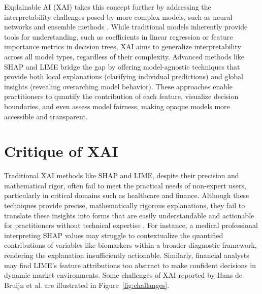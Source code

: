 \documentclass[times, twoside, watermark]{zHenriquesLab-StyleBioRxiv}
\begin{document}
Explainable AI (XAI) takes this concept further by addressing the interpretability challenges posed by more complex models, such as neural networks and ensemble methods \cite{typeexplain}. While traditional models inherently provide tools for understanding, such as coefficients in linear regression or feature importance metrics in decision trees, XAI aims to generalize interpretability across all model types, regardless of their complexity. Advanced methods like SHAP \cite{lundberg2017unified} and LIME \cite{ribeiro2016should} bridge the gap by offering model-agnostic techniques that provide both local explanations (clarifying individual predictions) and global insights (revealing overarching model behavior). These approaches enable practitioners to quantify the contribution of each feature, visualize decision boundaries, and even assess model fairness, making opaque models more accessible and transparent.




\section*{Critique of XAI}
Traditional XAI methods like SHAP and LIME, despite their precision and mathematical rigor, often fail to meet the practical needs of non-expert users, particularly in critical domains such as healthcare and finance. Although these techniques provide precise, mathematically rigorous explanations, they fail to translate these insights into forms that are easily understandable and actionable for practitioners without technical expertise \cite{vernaza2023contextualising}. For instance, a medical professional interpreting SHAP values may struggle to contextualize the quantified contributions of variables like biomarkers within a broader diagnostic framework, rendering the explanation insufficiently actionable. Similarly, financial analysts may find LIME's feature attributions too abstract to make confident decisions in dynamic market environments.
Some challenges of XAI reported by Hans de Bruijn et al. \cite{DEBRUIJN2022101666} are illustrated in Figure~\ref{fig:challanges}.
\end{document}
